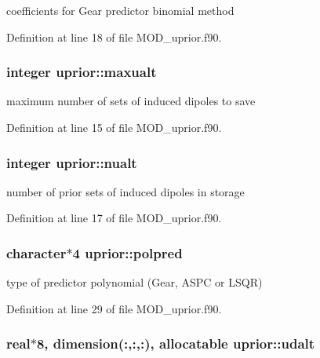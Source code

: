 coefficients for Gear predictor binomial method 



Definition at line 18 of file M\-O\-D\-\_\-uprior.\-f90.

\hypertarget{classuprior_a5d9038d2473c8075c0636977eafb4d57}{
\subsubsection[{maxualt}]{\setlength{\rightskip}{0pt plus 5cm}integer uprior\-::maxualt}}\label{classuprior_a5d9038d2473c8075c0636977eafb4d57}


maximum number of sets of induced dipoles to save 



Definition at line 15 of file M\-O\-D\-\_\-uprior.\-f90.

\hypertarget{classuprior_acc513c3b29d6e948f29333fa668adff3}{
\subsubsection[{nualt}]{\setlength{\rightskip}{0pt plus 5cm}integer uprior\-::nualt}}\label{classuprior_acc513c3b29d6e948f29333fa668adff3}


number of prior sets of induced dipoles in storage 



Definition at line 17 of file M\-O\-D\-\_\-uprior.\-f90.

\hypertarget{classuprior_af700e3d1134904cd27e3a631b0af018f}{
\subsubsection[{polpred}]{\setlength{\rightskip}{0pt plus 5cm}character$\ast$4 uprior\-::polpred}}\label{classuprior_af700e3d1134904cd27e3a631b0af018f}


type of predictor polynomial (Gear, A\-S\-P\-C or L\-S\-Q\-R) 



Definition at line 29 of file M\-O\-D\-\_\-uprior.\-f90.

\hypertarget{classuprior_ab7223a6643ed089c1e8126acc4a1dc80}{
\subsubsection[{udalt}]{\setlength{\rightskip}{0pt plus 5cm}real$\ast$8, dimension(\-:,\-:,\-:), allocatable uprior\-::udalt}}\label{classuprior_ab7223a6643ed089c1e8126acc4a1dc80}


